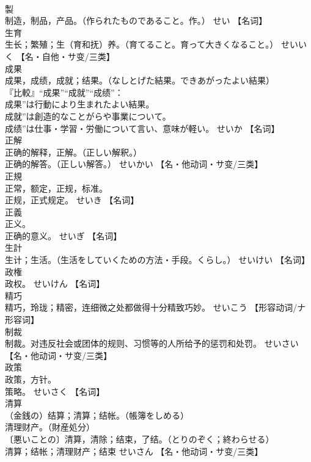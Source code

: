 \documentclass[8pt]{extreport}
\begin{document}
\begin{CJK}{UTF8}{min}
\\	製	
\\	制造，制品，产品。（作られたものであること。作。）	せい		【名词】
\\	生育	
\\	生长；繁殖；生（育和抚）养。（育てること。育って大きくなること。）	せいいく		【名・自他・サ变/三类】
\\	成果	
\\	成果，成绩，成就；结果。（なしとげた結果。できあがったよい結果） 
\\	『比較』“成果”“成就”“成绩”： 
\\	成果”は行動により生まれたよい結果。 
\\	成就”は創造的なことがらや事業について。 
\\	成绩”は仕事・学習・労働について言い、意味が軽い。	せいか		【名词】
\\	正解	
\\	正确的解释，正解。（正しい解釈。） 
\\	正确的解答。（正しい解答。）	せいかい		【名・他动词・サ变/三类】
\\	正規	
\\	正常，额定，正规，标准。 
\\	正规，正式规定。	せいき		【名词】
\\	正義	
\\	正义。 
\\	正确的意义。	せいぎ		【名词】
\\	生計	
\\	生计；生活。（生活をしていくための方法・手段。くらし。）	せいけい		【名词】
\\	政権	
\\	政权。	せいけん		【名词】
\\	精巧	
\\	精巧，玲珑；精密，连细微之处都做得十分精致巧妙。	せいこう		【形容动词/ナ形容词】
\\	制裁	
\\	制裁。对违反社会或团体的规则、习惯等的人所给予的惩罚和处罚。	せいさい		【名・他动词・サ变/三类】
\\	政策	
\\	政策，方针。 
\\	策略。	せいさく		【名词】
\\	清算	
\\	（金銭の）结算；清算；结帐。（帳簿をしめる） 
\\	清理财产。（財産処分） 
\\	〔悪いことの〕清算，清除；结束，了结。（とりのぞく；終わらせる） 
\\	清算；结帐；清理财产；结束	せいさん		【名・他动词・サ变/三类】

\end{CJK}
\end{document}
